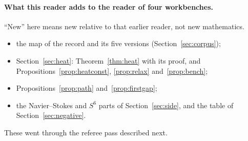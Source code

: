 \paragraph{What this reader adds to the reader of four workbenches.}
``New'' here means new relative to that earlier reader, not new mathematics.
\begin{itemize}
\item the map of the record and its five versions (Section~\ref{sec:corpus});
\item Section~\ref{sec:heat}: Theorem~\ref{thm:heat} with its proof, and Propositions~\ref{prop:heatconst}, \ref{prop:relax} and~\ref{prop:bench};
\item Propositions~\ref{prop:path} and~\ref{prop:firstgap};
\item the Navier--Stokes and $S^6$ parts of Section~\ref{sec:side}, and the table of Section~\ref{sec:negative}.
\end{itemize}
These went through the referee pass described next.

